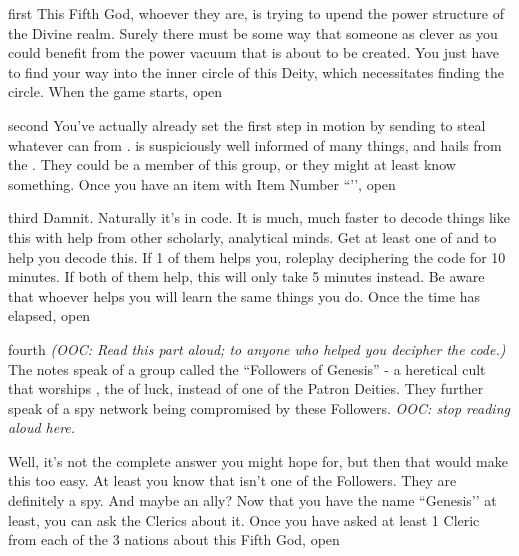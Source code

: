 \documentclass[notebook]{GL2020} %
\begin{document}
\startnotebook{\nTest{}}

\begin{page}{first}
This Fifth God, whoever they are, is trying to upend the power structure of the Divine realm. Surely there must be some way that someone as clever as you could benefit from the power vacuum that is about to be created. You just have to find your way into the inner circle of this Deity, which necessitates finding the circle. When the game starts, open 
\end{page}

\begin{page}{second}
You’ve actually already set the first step in motion by sending \cDisney{} to steal whatever \cDisney{\they} can from \cBunker{}. \cBunker{} is suspiciously well informed of many things, and hails from the \pShip{}. They could be a member of this group, or they might at least know something. Once you have an item with Item Number ``\iFolderOfNotes{\MYnumber}’’, open 
\end{page}

\begin{page}{third}
Damnit. Naturally it's in code. It is much, much faster to decode things like this with help from other scholarly, analytical minds. Get at least one of \cAssistantScientist{} and \cHeadScientist{} to help you decode this. If 1 of them helps you, roleplay deciphering the code for 10 minutes. If both of them help, this will only take 5 minutes instead. Be aware that whoever helps you will learn the same things you do. Once the time has elapsed, open 
\end{page}

\begin{page}{fourth}
\emph{(OOC: Read this part aloud; to anyone who helped you decipher the code.)} The notes speak of a group called the ``Followers of Genesis'' - a heretical cult that worships \cGenesis{}, the \cGenesis{\God} of luck, instead of one of the Patron Deities. They further speak of a spy network being compromised by these Followers. \emph{OOC: stop reading aloud here.}

Well, it’s not the complete answer you might hope for, but then that would make this too easy. At least you know that \cBunker{} isn’t one of the Followers. They are definitely a spy. And maybe an ally? Now that you have the name  ``Genesis’’ at least, you can ask the Clerics about it. Once you have asked at least 1 Cleric from each of the 3 nations about this Fifth God, open 
\end{page}
\end{document}
